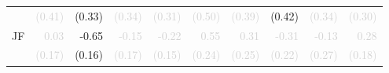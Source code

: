 \begin{tabular}{lrrrrrrrrr}
 &\textcolor{LightGray}{\tiny{(0.41)}} &\tiny{(0.33)} &\textcolor{LightGray}{\tiny{(0.34)}} &\textcolor{LightGray}{\tiny{(0.31)}} &\textcolor{LightGray}{\tiny{(0.50)}} &\textcolor{LightGray}{\tiny{(0.39)}} &\tiny{(0.42)} &\cellcolor{Gray}\textcolor{LightGray}{\tiny{(0.34)}} &\textcolor{LightGray}{\tiny{(0.30)}}\\[1ex]
\multirow{2}{*}{JF} &\textcolor{LightGray}{0.03} &-0.65 &\textcolor{LightGray}{-0.15} &\textcolor{LightGray}{-0.22} &\textcolor{LightGray}{0.55} &\textcolor{LightGray}{0.31} &\textcolor{LightGray}{-0.31} &\textcolor{LightGray}{-0.13} &\cellcolor{Gray}\textcolor{LightGray}{0.28}\\
 &\textcolor{LightGray}{\tiny{(0.17)}} &\tiny{(0.16)} &\textcolor{LightGray}{\tiny{(0.17)}} &\textcolor{LightGray}{\tiny{(0.15)}} &\textcolor{LightGray}{\tiny{(0.24)}} &\textcolor{LightGray}{\tiny{(0.25)}} &\textcolor{LightGray}{\tiny{(0.22)}} &\textcolor{LightGray}{\tiny{(0.27)}} &\cellcolor{Gray}\textcolor{LightGray}{\tiny{(0.18)}}\\[1ex]
\bottomrule
\end{tabular}
